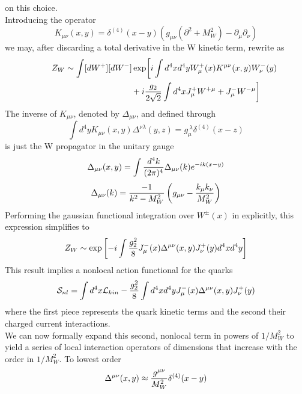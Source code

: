 on this choice.\\
Introducing the operator
\begin{equation}\label{kxy}
K_{\mu\nu}(x, y)=\delta^{(4)}(x-y)\left(g_{\mu\nu}(\partial^2+
  M^2_W)-\partial_\mu\partial_\nu\right)   \end{equation}
we may, after discarding a total derivative in the W kinetic term,
rewrite  as
\begin{eqnarray}\label{zw2}    \lefteqn{
Z_W\sim\int [dW^+][dW^-] \exp\biggl[ i\int d^4x d^4y W^+_\mu(x)
K^{\mu\nu}(x, y) W^-_\nu(y)  } \hspace{3cm}\nonumber\\
& & {}+i{g_2\over 2\sqrt{2}}\int d^4x
 J^+_\mu W^{+\mu}+J^-_\mu W^{-\mu} \biggr]
\end{eqnarray}
The inverse of $K_{\mu\nu}$, denoted by $\Delta_{\mu\nu}$, and
defined through
\begin{equation}\label{kde1}
\int d^4y K_{\mu\nu}(x, y) \Delta^{\nu\lambda}(y, z)=
 g^{\ \lambda}_\mu \delta^{(4)}(x-z)  \end{equation}
is just the W propagator in the unitary gauge
\begin{equation}\label{dexy}
\Delta_{\mu\nu}(x, y)=\int{d^4k\over (2\pi)^4}\Delta_{\mu\nu}(k)
  e^{-i k(x-y)}  \end{equation}
\begin{equation}\label{dek}
\Delta_{\mu\nu}(k)={-1\over k^2-M^2_W}\left(g_{\mu\nu}-
  {k_\mu k_\nu\over M^2_W}\right)   \end{equation}
Performing the gaussian functional integration over $W^\pm(x)$ in
 explicitly, this expression simplifies to
\begin{equation}\label{zetw}
Z_W\sim\exp\left[ -i\int{g^2_2\over 8}J^-_\mu(x)\Delta^{\mu\nu}(x, y)
J^+_\nu(y) d^4x d^4y \right]   \end{equation}
This result implies a nonlocal action functional for the quarks
\begin{equation}\label{snl}
{\cal S}_{nl}=\int d^4x {\cal L}_{kin}-
{g^2_2\over 8}\int d^4x d^4y J^-_\mu(x)\Delta^{\mu\nu}(x, y)
J^+_\nu(y)    \end{equation}
where the first piece represents the quark kinetic terms and the second
their charged current interactions.\\
We can now formally expand this second, nonlocal term in powers of
$1/M^2_W$ to yield a series of local interaction operators of
dimensions that increase with the order in $1/M^2_W$. To lowest order
\begin{equation}\label{dloc}
\Delta^{\mu\nu}(x, y)\approx{g^{\mu\nu}\over M^2_W}\delta^{(4)}(x-y) \end{equation}
